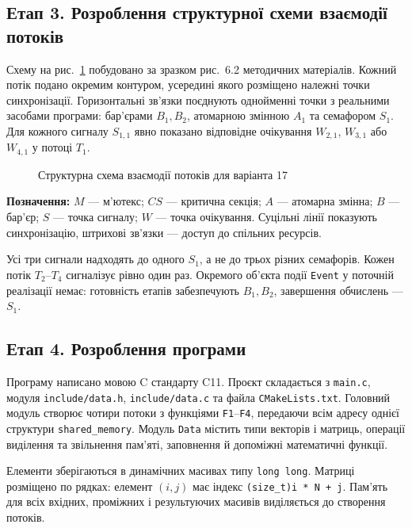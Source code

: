 \documentclass[12pt,a4paper]{article}
\begin{document}
\clearpage
\subsection{Етап 3. Розроблення структурної схеми взаємодії потоків}

Схему на рис.~\ref{fig:structure} побудовано за зразком рис.~6.2
методичних матеріалів. Кожний потік подано окремим контуром, усередині
якого розміщено належні точки синхронізації. Горизонтальні зв’язки
поєднують однойменні точки з реальними засобами програми: бар’єрами
$B_1,B_2$, атомарною змінною $A_1$ та семафором $S_1$. Для кожного
сигналу $S_{1,1}$ явно показано відповідне очікування
$W_{2,1}$, $W_{3,1}$ або $W_{4,1}$ у потоці $T_1$.

\begin{figure}[H]
\centering
\resizebox{\textwidth}{!}{}
\caption{Структурна схема взаємодії потоків для варіанта 17}
\label{fig:structure}
\end{figure}

\noindent\textbf{Позначення:} $M$ --- м’ютекс; $CS$ --- критична секція;
$A$ --- атомарна змінна; $B$ --- бар’єр; $S$ --- точка сигналу;
$W$ --- точка очікування. Суцільні лінії показують синхронізацію,
штрихові зв’язки --- доступ до спільних ресурсів.

Усі три сигнали надходять до одного $S_1$, а не до трьох різних
семафорів. Кожен потік $T_2$--$T_4$ сигналізує рівно один раз.
Окремого об’єкта події \texttt{Event} у поточній реалізації немає:
готовність етапів забезпечують $B_1,B_2$, завершення обчислень --- $S_1$.

\subsection{Етап 4. Розроблення програми}

Програму написано мовою C стандарту C11. Проєкт складається з
\texttt{main.c}, модуля \texttt{include/data.h},
\texttt{include/data.c} та файла \texttt{CMakeLists.txt}.
Головний модуль створює чотири потоки з функціями \texttt{F1}--\texttt{F4},
передаючи всім адресу однієї структури \texttt{shared\_memory}.
Модуль \texttt{Data} містить типи векторів і матриць, операції виділення
та звільнення пам’яті, заповнення й допоміжні математичні функції.

Елементи зберігаються в динамічних масивах типу \texttt{long long}.
Матриці розміщено по рядках: елемент $(i,j)$ має індекс
\texttt{(size\_t)i * N + j}. Пам’ять для всіх вхідних, проміжних і
результуючих масивів виділяється до створення потоків.
\end{document}

